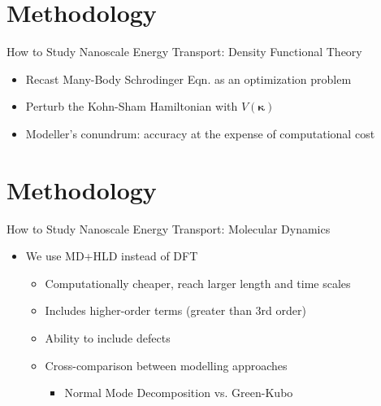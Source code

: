 \documentclass{beamer}
\begin{document}
\section{Methodology}
\begin{frame}{How to Study Nanoscale Energy Transport: Density Functional Theory}
\begin{itemize}
\item Recast Many-Body Schrodinger Eqn. as an optimization problem

\item Perturb the Kohn-Sham Hamiltonian with $V(\pmb{\kappa})$

\item Modeller's conundrum: accuracy at the expense of computational cost
\end{itemize}
\end{frame}

\section{Methodology}
\begin{frame}{How to Study Nanoscale Energy Transport: Molecular Dynamics}
\begin{itemize}
\item We use MD+HLD instead of DFT
\begin{itemize}
\item Computationally cheaper, reach larger length and time scales
\item Includes higher-order terms (greater than 3rd order)
\item Ability to include defects
\item Cross-comparison between modelling approaches
\begin{itemize}
\item Normal Mode Decomposition vs. Green-Kubo
\end{itemize}
\end{itemize}
\end{itemize}
\end{frame}


\end{document}
